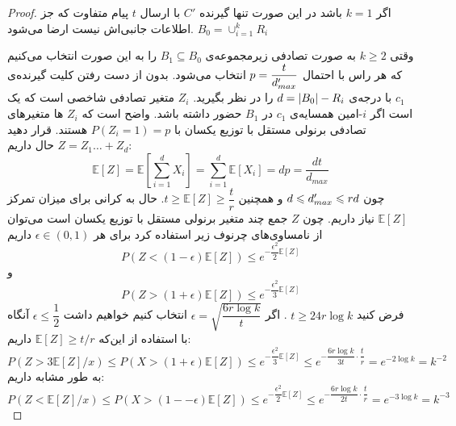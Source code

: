 \begin{proof}
    اگر
    $k = 1$
    باشد در این صورت تنها گیرنده
    $C'$
    با ارسال
    $t$
    پیام متفاوت که جز اطلاعات جانبی‌اش نیست ارضا می‌شود.
    $B_0 = \cup_{i = 1}^{k} R_i$

    وقتی
    $k \geq 2$
    به صورت تصادفی زیرمجموعه‌ی
    $B_1 \subseteq B_0$
    را به این صورت انتخاب می‌کنیم که هر راس با احتمال
    $p = \dfrac{t}{d_{max}'}$
    انتخاب می‌شود. بدون از دست رفتن کلیت گیرنده‌ی
    $c_1$
    با درجه‌ی
    $d = \left|{B_0}\right| - R_i$
    را در نظر بگیرید.
    $Z_i$
    متغیر تصادفی شاخصی است که یک است اگر
    $i$-امین همسایه‌ی
    $c_1$
    در
    $B_1$
    حضور داشته باشد. واضح است که
    $Z_i$
    ها متغیرهای تصادفی برنولی مستقل با توزیع یکسان با
    $P(Z_i = 1) = p$
    هستند. قرار دهید
    $Z = Z_1 \ldots + Z_d$
    حال داریم:
    \begin{equation}
        \mathbb{E}[Z] = \mathbb{E}[\sum\limits_{i = 1}^{d} X_i ] = \sum\limits_{i = 1}^{d} \mathbb{E}[X_i] = dp = \dfrac{dt}{d_{max}}
    \end{equation}
    چون
    $d \leqslant d_{max}' \leqslant rd$
    و همچنین
    $t \geq \mathbb{E}[Z] \geq \dfrac{t}{r}$. حال به کرانی برای میزان تمرکز
    $\mathbb{E}[Z]$
    نیاز داریم. چون
    $Z$
    جمع چند متغیر برنولی مستقل با توزیع یکسان است می‌توان از نامساوی‌های چرنوف زیر استفاده کرد
    \cite{Dubhashi_Panconesi_2009}
    برای هر
    $\epsilon \in (0, 1)$
    داریم
    $$P(Z < (1 - \epsilon) \mathbb{E}[Z]) \leq e^{- \dfrac{\epsilon^2}{2} \mathbb{E}[Z]}$$
    و
    $$P(Z > (1 + \epsilon) \mathbb{E}[Z]) \leq e^{- \dfrac{\epsilon^2}{3} \mathbb{E}[Z]}$$
    فرض کنید
    $t \geq 24 r \log k$
    . اگر
    $\epsilon = \sqrt{\dfrac{6r \log k}{t}}$
    انتخاب کنیم خواهیم داشت
    $\epsilon \leq \dfrac{1}{2}$
    آنگاه با استفاده از این‌که
    $\mathbb{E}[Z] \geq t/r$
    داریم:
    \begin{equation}
        P(Z > 3 \mathbb{E}[Z]/x) \leq P(X > (1 + \epsilon) \mathbb{E}[Z]) \leq e^{-\dfrac{\epsilon^2}{3} \mathbb{E}[Z]} \leq e^{- \dfrac{6 r \log k}{3 t} \cdot \dfrac{t}{r}} = e^{- 2 \log k} = k^{-2}
    \end{equation}
    به طور مشابه داریم:
    \begin{equation}
        P(Z < \mathbb{E}[Z]/x) \leq P(X > (1 -- \epsilon) \mathbb{E}[Z]) \leq e^{-\dfrac{\epsilon^2}{2} \mathbb{E}[Z]} \leq e^{- \dfrac{6 r \log k}{2 t} \cdot \dfrac{t}{r}} = e^{-3 \log k} = k^{-3}
    \end{equation}


\end{proof}
